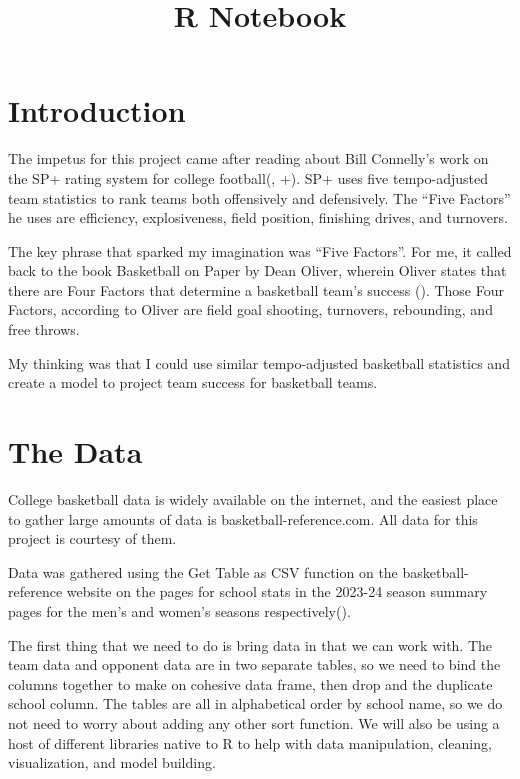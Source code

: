 \documentclass[
]{article}
\title{R Notebook}
\author{}
\date{\vspace{-2.5em}}
\begin{document}
\maketitle

\section{Introduction}\label{introduction}

The impetus for this project came after reading about Bill Connelly's
work on the SP+ rating system for college
football(, +). SP+ uses
five tempo-adjusted team statistics to rank teams both offensively and
defensively. The ``Five Factors'' he uses are efficiency, explosiveness,
field position, finishing drives, and turnovers.

The key phrase that sparked my imagination was ``Five Factors''. For me,
it called back to the book Basketball on Paper by Dean Oliver, wherein
Oliver states that there are Four Factors that determine a basketball
team's success (). Those
Four Factors, according to Oliver are field goal shooting, turnovers,
rebounding, and free throws.

My thinking was that I could use similar tempo-adjusted basketball
statistics and create a model to project team success for basketball
teams.

\section{The Data}\label{the-data}

College basketball data is widely available on the internet, and the
easiest place to gather large amounts of data is
basketball-reference.com. All data for this project is courtesy of them.

Data was gathered using the Get Table as CSV function on the
basketball-reference website on the pages for school stats in the
2023-24 season summary pages for the men's and women's seasons
respectively().

The first thing that we need to do is bring data in that we can work
with. The team data and opponent data are in two separate tables, so we
need to bind the columns together to make on cohesive data frame, then
drop and the duplicate school column. The tables are all in alphabetical
order by school name, so we do not need to worry about adding any other
sort function. We will also be using a host of different libraries
native to R to help with data manipulation, cleaning, visualization, and
model building.
\end{document}
